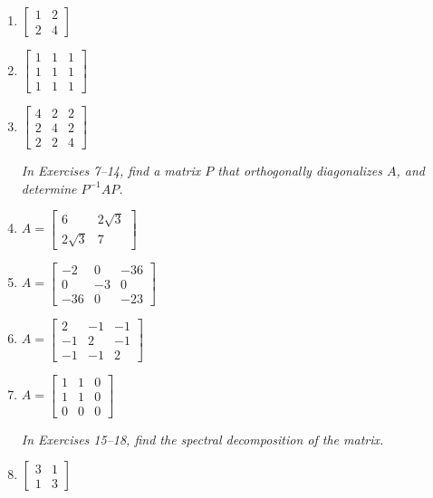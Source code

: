 \documentclass{article}
\theoremstyle{mystyle}
\begin{document}
\begin{enumerate}

\item $\begin{bmatrix}1&2\\2&4\end{bmatrix}$

\item[3.] $\begin{bmatrix}1&1&1\\1&1&1\\1&1&1\end{bmatrix}$

\item[4.] $\begin{bmatrix}4&2&2\\2&4&2\\2&2&4\end{bmatrix}$

\noindent\textit{In Exercises 7--14, find a matrix $P$ that orthogonally diagonalizes $A$,
and determine $P^{-1}AP$.}

\item[7.] $A = \begin{bmatrix}6&2\sqrt{3}\\2\sqrt{3}&7\end{bmatrix}$

\item[9.] $A = \begin{bmatrix}-2&0&-36\\0&-3&0\\-36&0&-23\end{bmatrix}$

\item[11.] $A = \begin{bmatrix}2&-1&-1\\-1&2&-1\\-1&-1&2\end{bmatrix}$

\item[12.] $A = \begin{bmatrix}1&1&0\\1&1&0\\0&0&0\end{bmatrix}$

\noindent\textit{In Exercises 15--18, find the spectral decomposition of the matrix.}

\item[15.] $\begin{bmatrix}3&1\\1&3\end{bmatrix}$


\end{enumerate}
\end{document}
